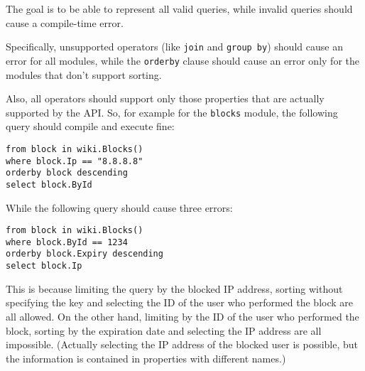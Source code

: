 The goal is to be able to represent all valid queries, while invalid queries should cause a compile-time error.

Specifically, unsupported operators (like \lstinline{join} and \lstinline{group by}) should cause an error for all modules,
while the \lstinline{orderby} clause should cause an error only for the modules that don't support sorting.

Also, all operators should support only those properties that are actually supported by the \ac{API}.
So, for example for the \verb,blocks, module, the following query should compile and execute fine:

\begin{lstlisting}
from block in wiki.Blocks()
where block.Ip == "8.8.8.8"
orderby block descending
select block.ById
\end{lstlisting}

While the following query should cause three errors:

\begin{lstlisting}
from block in wiki.Blocks()
where block.ById == 1234
orderby block.Expiry descending
select block.Ip
\end{lstlisting}

This is because limiting the query by the blocked \ac{IP} address, sorting without specifying the key and selecting the ID of the user who performed the block are all allowed.
On the other hand, limiting by the ID of the user who performed the block, sorting by the expiration date and selecting the \ac{IP} address are all impossible.
(Actually selecting the \ac{IP} address of the blocked user is possible, but the information is contained in properties with different names.)